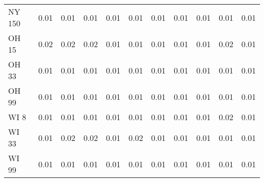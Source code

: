 \begin{tabular}{lrrrrrrrrrr}
NY 150 &   0.01 &                         0.01 &                     0.01 &                     0.01 &                          0.01 &                       0.01 &                         0.01 &                                 0.01 &                          0.01 &                         0.01 \\
OH 15  &   0.02 &                         0.02 &                     0.02 &                     0.01 &                          0.01 &                       0.01 &                         0.01 &                                 0.01 &                          0.02 &                         0.01 \\
OH 33  &   0.01 &                         0.01 &                     0.01 &                     0.01 &                          0.01 &                       0.01 &                         0.01 &                                 0.01 &                          0.01 &                         0.01 \\
OH 99  &   0.01 &                         0.01 &                     0.01 &                     0.01 &                          0.01 &                       0.01 &                         0.01 &                                 0.01 &                          0.01 &                         0.01 \\
WI 8   &   0.01 &                         0.01 &                     0.01 &                     0.01 &                          0.01 &                       0.01 &                         0.01 &                                 0.01 &                          0.02 &                         0.01 \\
WI 33  &   0.01 &                         0.02 &                     0.02 &                     0.01 &                          0.02 &                       0.01 &                         0.01 &                                 0.01 &                          0.01 &                         0.01 \\
WI 99  &   0.01 &                         0.01 &                     0.01 &                     0.01 &                          0.01 &                       0.01 &                         0.01 &                                 0.01 &                          0.01 &                         0.01 \\
\bottomrule
\end{tabular}
